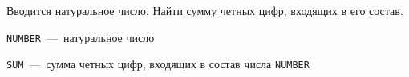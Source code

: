 Вводится натуральное число. Найти сумму четных цифр, входящих в его состав.

\InputFile

\texttt{NUMBER}~---~натуральное число

\OutputFile

\texttt{SUM}~---~сумма четных цифр, входящих в состав числа \texttt{NUMBER}

\SAMPLES